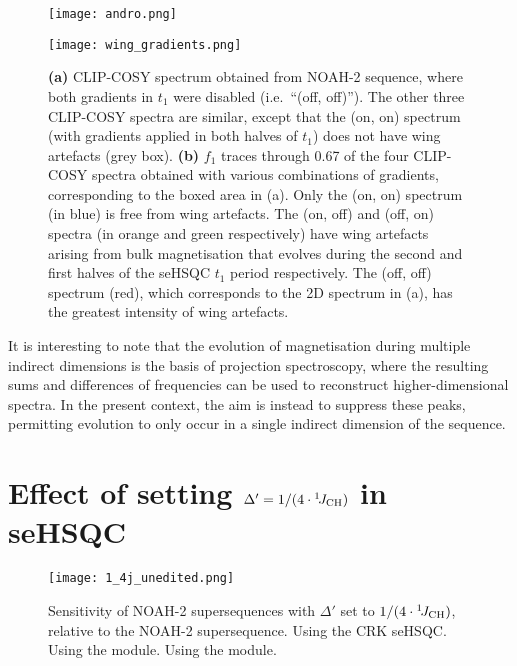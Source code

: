 \begin{figure}
    \centering
    \texttt{[image: andro.png]}

    \texttt{[image: wing\_gradients.png]}
    \caption{
        \textbf{(a)} CLIP-COSY spectrum obtained from NOAH-2  sequence, where both gradients in $t_1$ were disabled (i.e.\ ``(off, off)'').
        The other three CLIP-COSY spectra are similar, except that the (on, on) spectrum (with gradients applied in both halves of $t_1$) does not have wing artefacts (grey box).
        \textbf{(b)} $f_1$ traces through \SI{0.67}{\ppm} of the four CLIP-COSY spectra obtained with various combinations of gradients, corresponding to the boxed area in (a).
        Only the (on, on) spectrum (in blue) is free from wing artefacts.
        The (on, off) and (off, on) spectra (in orange and green respectively) have wing artefacts arising from bulk magnetisation that evolves during the second and first halves of the seHSQC $t_1$ period respectively.
        The (off, off) spectrum (red), which corresponds to the 2D spectrum in (a), has the greatest intensity of wing artefacts.
        \andro{}
    }
    \label{fig:wing_gradients}
\end{figure}

It is interesting to note that the evolution of magnetisation during multiple indirect dimensions is the basis of projection spectroscopy,\autocite{projrecon} where the resulting sums and differences of frequencies can be used to reconstruct higher-dimensional spectra.
In the present context, the aim is instead to suppress these peaks, permitting evolution to only occur in a single indirect dimension of the sequence.


\section{Effect of setting \texorpdfstring{$\Delta' = 1/(4\cdot\onejch)$}{Delta' = 1/(4*1JCH)} in seHSQC}

\begin{figure}
    \centering
    \texttt{[image: 1\_4j\_unedited.png]}
    {\label{fig:1_4j_unedited_crk}}
    {\label{fig:1_4j_unedited_spv1}}
    {\label{fig:1_4j_unedited_spv2}}
    \caption{
        Sensitivity of NOAH-2  supersequences with $\Delta'$ set to $1/(4\cdot\onejch)$, relative to the NOAH-2  supersequence.
        \textbf{} Using the CRK seHSQC.
        \textbf{} Using the \noahSpa{} module.
        \textbf{} Using the \noahSpb{} module.
        \andro{}
    }
    \label{fig:1_4j_unedited}
\end{figure}

